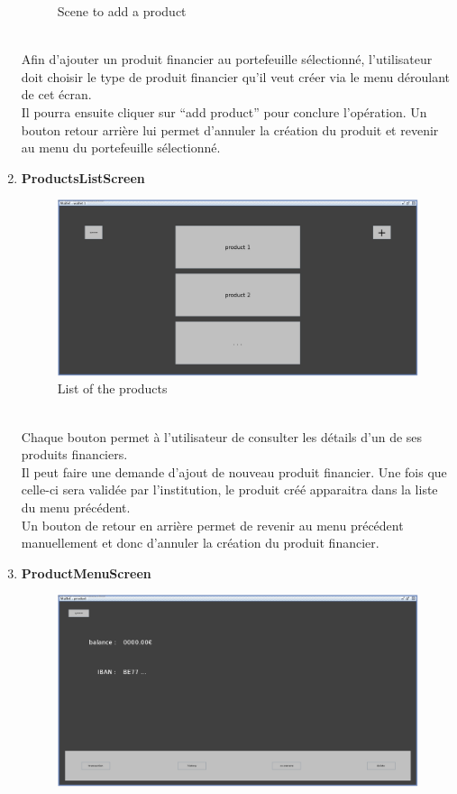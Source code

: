 \documentclass[../rapport.tex]{subfiles}
\begin{document}
\begin{enumerate}
\begin{figure}[h!]
			\caption{Scene to add a product}
		\end{figure}
		\\
Afin d'ajouter un produit financier au portefeuille sélectionné, l'utilisateur doit choisir le type de produit financier qu'il veut créer via le menu déroulant de cet écran.\\
Il pourra ensuite cliquer sur ``add product'' pour conclure l'opération. Un bouton retour arrière lui permet d'annuler la création du produit et revenir au menu du portefeuille sélectionné.

\item \textbf{ProductsListScreen} \\
		\begin{figure}[h!]
				\centering \includegraphics[scale=0.2]{ressources/photos_diagrammes/app1/gui/productsList.jpg}
				\caption{List of the products}
		\end{figure}
		\\
Chaque bouton permet à l'utilisateur de consulter les détails d'un de ses produits financiers.\\
Il peut faire une demande d'ajout de nouveau produit financier. Une fois que celle-ci sera validée par l'institution, le produit créé apparaitra dans la liste du menu précédent.\\
Un bouton de retour en arrière permet de revenir au menu précédent manuellement et donc d'annuler la création du produit financier.
\newpage
\item \textbf{ProductMenuScreen}\\
		\begin{figure}[h!]
				\centering \includegraphics[scale=0.2]{ressources/photos_diagrammes/app1/gui/productMenu.jpg}

\end{figure}
\end{enumerate}
\end{document}
